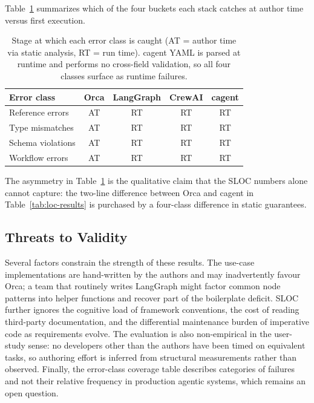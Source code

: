 \documentclass[sigconf,nonacm]{acmart}
\begin{document}
Table~\ref{tab:error-coverage} summarizes which of the four buckets each
stack catches at author time versus first execution.

\begin{table}[t]
  \centering
  \caption{Stage at which each error class is caught (AT = author time
  via static analysis, RT = run time). cagent YAML is parsed at runtime
  and performs no cross-field validation, so all four classes surface as
  runtime failures.}
  \label{tab:error-coverage}
  \small
  \begin{tabular}{@{}lcccc@{}}
    \toprule
    \textbf{Error class} & \textbf{Orca} & \textbf{LangGraph} & \textbf{CrewAI} & \textbf{cagent} \\
    \midrule
    Reference errors  & AT & RT & RT & RT \\
    Type mismatches   & AT & RT & RT & RT \\
    Schema violations & AT & RT & RT & RT \\
    Workflow errors   & AT & RT & RT & RT \\
    \bottomrule
  \end{tabular}
\end{table}

The asymmetry in Table~\ref{tab:error-coverage} is the qualitative claim
that the SLOC numbers alone cannot capture: the two-line difference
between Orca and cagent in Table~\ref{tab:loc-results} is purchased by a
four-class difference in static guarantees.

\subsection{Threats to Validity}
\label{sec:evaluation:validity}

Several factors constrain the strength of these results. The use-case
implementations are hand-written by the authors and may inadvertently
favour Orca; a team that routinely writes LangGraph might factor common
node patterns into helper functions and recover part of the boilerplate
deficit. SLOC further ignores the cognitive load of framework conventions,
the cost of reading third-party documentation, and the differential
maintenance burden of imperative code as requirements evolve. The
evaluation is also non-empirical in the user-study sense: no developers
other than the authors have been timed on equivalent tasks, so authoring
effort is inferred from structural measurements rather than observed.
Finally, the error-class coverage table describes categories of failures
and not their relative frequency in production agentic systems, which
remains an open question.
\end{document}
